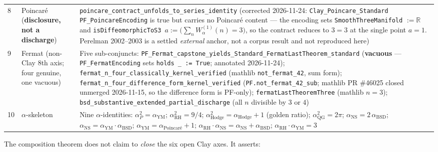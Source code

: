 \begin{table}[h]
\begin{tabular}{p{0.5cm}p{3.0cm}p{7.5cm}}
8 & Poincar\'e (\textbf{disclosure, not a discharge}) & \texttt{poincare\_contract\_unfolds\_to\_series\_identity}
  (corrected 2026-11-24: \texttt{Clay\_Poincare\_Standard
   PF\_PoincareEncoding} is true but carries no Poincar\'e content ---
   the encoding sets \texttt{SmoothThreeManifold} $:= \mathbb{R}$ and
   \texttt{isDiffeomorphicToS3}~$a := \big(\sum_n W_\alpha^{(1)}(n) = 3\big)$,
   so the contract reduces to $3 = 3$ at the single point $a = 1$.
   Perelman 2002--2003 is a settled \emph{external} anchor, not a
   corpus result and not reproduced here) \\
9 & Fermat (non-Clay 8th axis; four genuine, one vacuous) & Five sub-conjuncts:
  \texttt{PF\_Fermat\_capstone\_yields\_Standard\_FermatLastTheorem\_standard}
  (\textbf{vacuous} --- \texttt{PF\_FermatEncoding} sets
  \texttt{holds \_ := True}; annotated 2026-11-24);
  \texttt{fermat\_n\_four\_classically\_kernel\_verified}
  (mathlib \texttt{not\_fermat\_42}, sum form);
  \texttt{fermat\_n\_four\_difference\_form\_kernel\_verified}
  (\texttt{PF.not\_fermat\_42\_sub}; mathlib PR \#46025 closed
  unmerged 2026-11-15, so the difference form is PF-only);
  \texttt{fermatLastTheoremThree} (mathlib $n = 3$);
  \texttt{bsd\_substantive\_extended\_partial\_discharge} (all $n$
  divisible by $3$ or $4$) \\
10 & $\alpha$-skeleton & Nine $\alpha$-identities:
  $\alpha_P^2 = \alpha_{\text{YM}}$;
  $\alpha_{\text{RH}}^2 = 9/4$;
  $\alpha_{\text{Hodge}}^2 = \alpha_{\text{Hodge}} + 1$ (golden ratio);
  $\alpha_{\text{QG}}^2 = 2\pi$;
  $\alpha_{\text{NS}} = 2\,\alpha_{\text{BSD}}$;
  $\alpha_{\text{NS}} = \alpha_{\text{YM}} \cdot \alpha_{\text{BSD}}$;
  $\alpha_{\text{YM}} = \alpha_{\text{Poincar\'e}} + 1$;
  $\alpha_{\text{RH}} \cdot \alpha_{\text{NS}} = \alpha_{\text{NS}} + \alpha_{\text{BSD}}$;
  $\alpha_{\text{RH}} \cdot \alpha_{\text{YM}} = 3$ \\
\bottomrule
\end{tabular}
\end{table}

The composition theorem does not claim to \emph{close} the six open
Clay axes.  It asserts:

